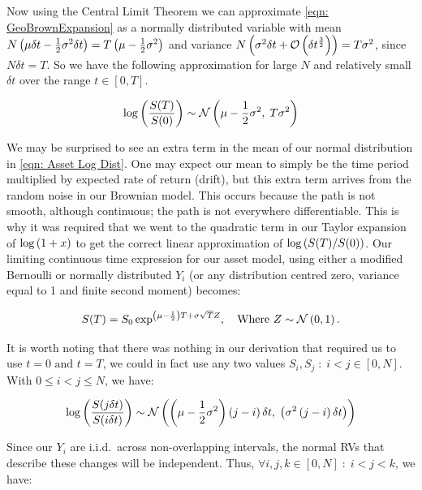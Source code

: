 Now using the Central Limit Theorem we can approximate \autoref{eqn: GeoBrownExpansion} as a normally distributed variable with mean \(N\left(\mu\delta t - \frac{1}{2}\sigma^2\delta t\right) = T\left(\mu - \frac{1}{2}\sigma^2\right)\) and variance \(N\left(\sigma^2\delta t + \mathcal{O}\left(\delta t^\frac{3}{2}\right)\right) = T\sigma^2\), since \(N\delta t = T\). So we have the following approximation for large \(N\) and relatively small \(\delta t\) over the range \(t\in[0,T]\).

\begin{equation}\label{eqn: Asset Log Dist}
    \log\left(\frac{S(T)}{S(0)}\right) \sim \mathcal{N}\left(\mu - \frac{1}{2}\sigma^2,\; T\sigma^2\right)
\end{equation}

We may be surprised to see an extra term in the mean of our normal distribution in \autoref{eqn: Asset Log Dist}. One may expect our mean to simply be the time period multiplied by expected rate of return (drift), but this extra term arrives from the random noise in our Brownian model. This occurs because the path is not smooth, although continuous; the path is not everywhere differentiable. This is why it was required that we went to the quadratic term in our Taylor expansion of \(\log\left(1+x\right)\) to get the correct linear approximation of \(\log\left(S(T)/S(0)\right)\).
\nline{}
Our limiting continuous time expression for our asset model, using either a modified Bernoulli or normally distributed \(Y_i\) (or any distribution centred zero, variance equal to 1 and finite second moment) becomes:

\begin{equation}\label{eqn:c1:S(T)}
    S(T) = S_0\exp^{\left(\mu-\frac{1}{2}\right)T+\sigma\sqrt{T}Z},\quad\text{Where \(Z\sim\mathcal{N}\left(0,1\right). \)}
\end{equation}

It is worth noting that there was nothing in our derivation that required us to use \(t = 0 \text{ and } t = T\), we could in fact use any two values \(S_i, S_j\;:\; i < j\in [0,N]\). With \(0 \leq i < j \leq N\), we have:

\begin{equation}\label{eqn:c1: i,j log distribution}
    \log\left(\frac{S(j\delta t)}{S(i\delta t)}\right) \sim \mathcal{N}\left(\left(\mu - \frac{1}{2}\sigma^2\right)\left(j-i\right)\delta t,\;\left(\sigma^2\left(j-i\right)\delta t\right)\right)
\end{equation}

Since our \(Y_i\) are i.i.d.~across non-overlapping intervals, the normal RVs that describe these changes will be independent. Thus, \(\forall i,j,k \in [0,N]\; : \; i < j < k\), we have:

